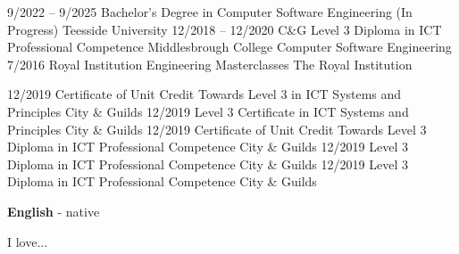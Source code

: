 \documentclass[9pt]{developercv} %
\begin{document}


\begin{entrylist}
	\entry
		{9/2022 -- 9/2025}
		{Bachelor's Degree in Computer Software Engineering (In Progress)}
		{Teesside University}
		{}
	\entry
		{12/2018 -- 12/2020}
		{C\&G Level 3 Diploma in ICT Professional Competence}
		{Middlesbrough College}
		{Computer Software Engineering}
	\entry
		{7/2016}
		{Royal Institution Engineering Masterclasses}
		{The Royal Institution}
		{}
\end{entrylist}

\begin{entrylist}
	\entry
		{12/2019}
		{Certificate of Unit Credit Towards Level 3 in ICT Systems and Principles}
		{City \& Guilds}
		{}
	\entry
		{12/2019}
		{Level 3 Certificate in ICT Systems and Principles}
		{City \& Guilds}
		{}
	\entry
		{12/2019}
		{Certificate of Unit Credit Towards Level 3 Diploma in ICT Professional Competence}
		{City \& Guilds}
		{}
	\entry
		{12/2019}
		{Level 3 Diploma in ICT Professional Competence}
		{City \& Guilds}
		{}
	\entry
		{12/2019}
		{Level 3 Diploma in ICT Professional Competence}
		{City \& Guilds}
		{}
\end{entrylist}




\begin{minipage}[t]{0.3\textwidth}
	\vspace{-\baselineskip} %

	
	\textbf{English} - native\\
\end{minipage}
\hfill
\begin{minipage}[t]{0.7\textwidth}
	\vspace{-\baselineskip} %
	
	
	I love... \lorem
\end{minipage}
\end{document}
